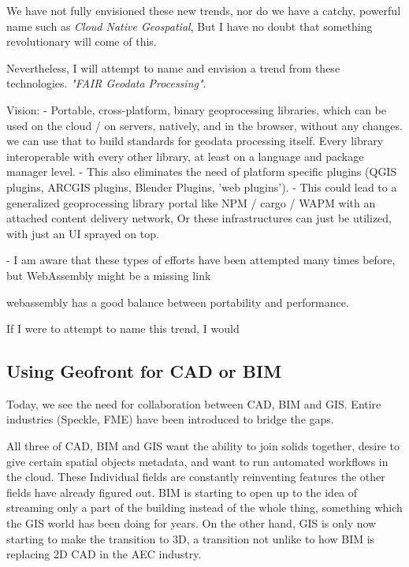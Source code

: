 We have not fully envisioned these new trends, nor do we have a catchy, powerful name such as \emph{Cloud Native Geospatial}, But I have no doubt that something revolutionary will come of this. 

Nevertheless, I will attempt to name and envision a trend from these technologies. \emph{"FAIR Geodata Processing"}.

Vision: 
- Portable, cross-platform, binary geoprocessing libraries, which can be used on the cloud / on servers, natively, and in the browser, without any changes. 
\m{->} we can use that to build standards for geodata processing itself. Every  library interoperable with every other library, at least on a language and package manager level.
- This also eliminates the need of platform specific plugins (QGIS plugins, ARCGIS plugins, Blender Plugins, 'web plugins').
- This could lead to a generalized geoprocessing library portal like NPM / cargo / WAPM with an attached content delivery network, Or these infrastructures can just be utilized, with just an UI sprayed on top.

- I am aware that these types of efforts have been attempted many times before, but WebAssembly might be a missing link 

\m{->} webassembly has a good balance between portability and performance.

\m{->}

If I were to attempt to name this trend, I would

\subsection{Using Geofront for CAD or  BIM}


Today, we see the need for collaboration between CAD, BIM and GIS. Entire industries (Speckle, FME) have been introduced to bridge the gaps. 

All three of CAD, BIM and GIS want the ability to join solids together, desire to give certain spatial objects metadata, and want to run automated workflows in the cloud. These Individual fields are constantly reinventing features the other fields have already figured out. BIM is starting to open up to the idea of streaming only a part of the building instead of the whole thing, something which the GIS world has been doing for years. On the other hand, GIS is only now starting to make the transition to 3D, a transition not unlike to how BIM is replacing 2D CAD in the AEC industry. 

